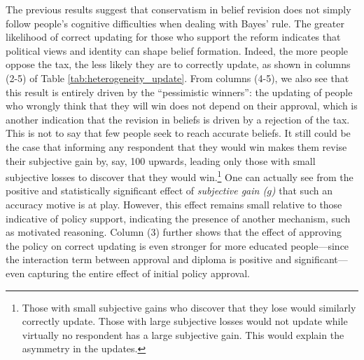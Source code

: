\documentclass[12pt]{article} %
\begin{document}
\begin{appendices}
The previous results suggest that conservatism in belief revision does not simply follow people's cognitive difficulties when dealing with Bayes' rule. The greater likelihood of correct updating for those who support the reform indicates that political views and identity can shape belief formation. Indeed, the more people oppose the tax, the less likely they are to correctly update, as shown in columns (2-5) of Table \ref{tab:heterogeneity_update}. From columns (4-5), we also see that this result is entirely driven by the ``pessimistic winners'': the updating of people who wrongly think that they will win does not depend on their approval, which is another indication that the revision in beliefs is driven by a rejection of the tax. This is not to say that few people seek to reach accurate beliefs. It still could be the case that informing any respondent that they would win makes them revise their subjective gain by, say, 100\euros{} upwards, leading only those with small subjective losses to discover that they would win.\footnote{Those with small subjective gains who discover that they lose would similarly correctly update. Those with large subjective losses would not update while virtually no respondent has a large subjective gain. This would explain the asymmetry in the updates.} One can actually see from the positive and statistically significant effect of \textit{subjective gain ($g$)} that such an accuracy motive is at play. However, this effect remains small relative to those indicative of policy support, indicating the presence of another mechanism, such as motivated reasoning. Column (3) further shows that the effect of approving the policy on correct updating is even stronger for more educated people---since the interaction term between approval and diploma is positive and significant---even capturing the entire effect of initial policy approval. %




\end{appendices}
\end{document}
